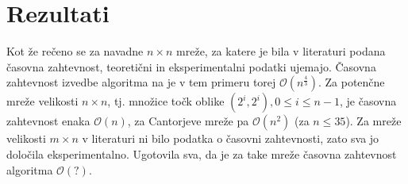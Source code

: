 \documentclass[a4paper]{article}
\begin{document}
\section{Rezultati}
Kot že rečeno se za navadne $n \times n$ mreže, za katere je bila v literaturi podana časovna zahtevnost, teoretični in eksperimentalni podatki ujemajo. Časovna zahtevnost izvedbe algoritma na
je v tem primeru torej $\mathcal{O}(n ^ \frac{4}{3})$. Za potenčne mreže velikosti $n \times n$, tj. množice točk oblike $(2^i, 2^i), 0 \leq i \leq n - 1$, je časovna zahtevnost enaka
$\mathcal{O}(n)$, za Cantorjeve mreže pa $\mathcal{O}(n^2)$ (za $n \leq 35$).
Za mreže velikosti $m \times n$ v literaturi ni bilo podatka o časovni zahtevnosti, zato sva jo določila eksperimentalno. Ugotovila sva, da je za take mreže časovna zahtevnost algoritma 
$\mathcal{O}(?)$. 
\end{document}
